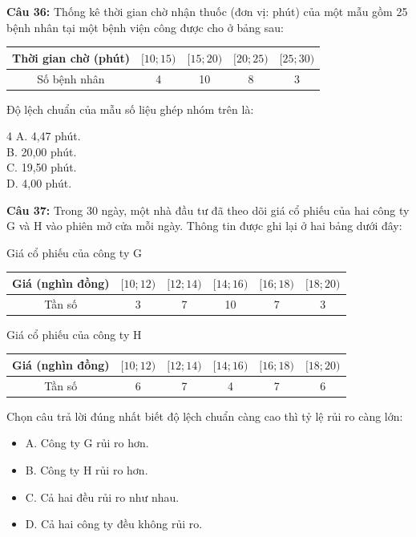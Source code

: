 \documentclass[12pt]{article}
\begin{document}
	\vspace{4mm}
	
	\noindent \textbf{Câu 36:} Thống kê thời gian chờ nhận thuốc (đơn vị: phút) của một mẫu gồm 25 bệnh nhân tại một bệnh viện công được cho ở bảng sau:
	\begin{center}
		\renewcommand{\arraystretch}{1.3}
		\begin{tabular}{|c|c|c|c|c|}
			\hline
			Thời gian chờ (phút) & $[10; 15)$ & $[15; 20)$ & $[20; 25)$ & $[25; 30)$ \\
			\hline
			Số bệnh nhân & 4 & 10 & 8 & 3 \\
			\hline
		\end{tabular}
	\end{center}
	Độ lệch chuẩn của mẫu số liệu ghép nhóm trên là:
	\begin{multicols}{4}
		A. 4,47 phút. \\
		B. 20,00 phút. \\
		C. 19,50 phút. \\
		D. 4,00 phút.
	\end{multicols}
	
	\noindent \textbf{Câu 37:} Trong 30 ngày, một nhà đầu tư đã theo dõi giá cổ phiếu của hai công ty G và H vào phiên mở cửa mỗi ngày. Thông tin được ghi lại ở hai bảng dưới đây:
	\begin{center}
		Giá cổ phiếu của công ty G
		\renewcommand{\arraystretch}{1.3}
		\begin{tabular}{|c|c|c|c|c|c|}
			\hline
			Giá (nghìn đồng) & $[10; 12)$ & $[12; 14)$ & $[14; 16)$ & $[16; 18)$ & $[18; 20)$ \\
			\hline
			Tần số & 3 & 7 & 10 & 7 & 3 \\
			\hline
		\end{tabular}
	\end{center}
	\begin{center}
		Giá cổ phiếu của công ty H
		\renewcommand{\arraystretch}{1.3}
		\begin{tabular}{|c|c|c|c|c|c|}
			\hline
			Giá (nghìn đồng) & $[10; 12)$ & $[12; 14)$ & $[14; 16)$ & $[16; 18)$ & $[18; 20)$ \\
			\hline
			Tần số & 6 & 7 & 4 & 7 & 6 \\
			\hline
		\end{tabular}
	\end{center}
	Chọn câu trả lời đúng nhất biết độ lệch chuẩn càng cao thì tỷ lệ rủi ro càng lớn:
	\begin{itemize}[label=, leftmargin=*]
		\item A. Công ty G rủi ro hơn.
		\item B. Công ty H rủi ro hơn.
		\item C. Cả hai đều rủi ro như nhau.
		\item D. Cả hai công ty đều không rủi ro.
	\end{itemize}
	
\end{document}
